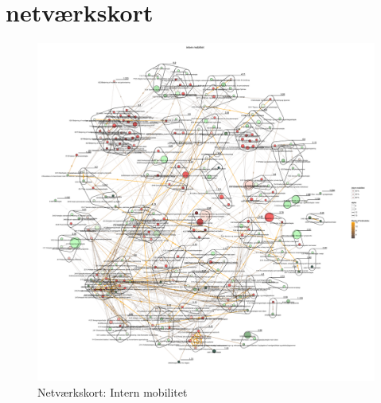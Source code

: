 
\newpage \chapter{netværkskort \label{app_netvaerkskort}}







\begin{figure}[H]
\begin{center}
	\caption{Netværkskort: Intern mobilitet}
	\label{appendiks kort within.mob}
	\includegraphics[width=1.0\textwidth]{fig/netvaerkskort/kort_intern_mob.pdf}
\end{center}
\end{figure}
\restoregeometry




